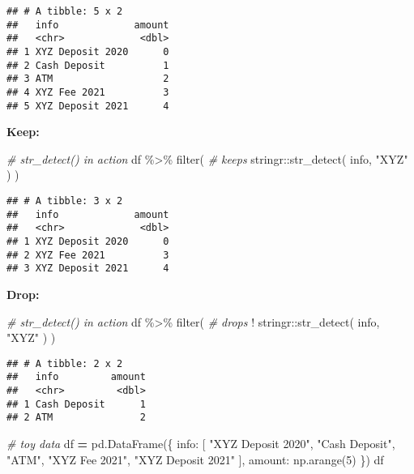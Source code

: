 \documentclass[
]{book}
\newenvironment{Shaded}{\begin{snugshade}}{\end{snugshade}}
\newcommand{\CommentTok}[1]{\textcolor[rgb]{0.56,0.35,0.01}{\textit{#1}}}
\newcommand{\DecValTok}[1]{\textcolor[rgb]{0.00,0.00,0.81}{#1}}
\newcommand{\FunctionTok}[1]{\textcolor[rgb]{0.00,0.00,0.00}{#1}}
\newcommand{\NormalTok}[1]{#1}
\newcommand{\OperatorTok}[1]{\textcolor[rgb]{0.81,0.36,0.00}{\textbf{#1}}}
\newcommand{\SpecialCharTok}[1]{\textcolor[rgb]{0.00,0.00,0.00}{#1}}
\newcommand{\StringTok}[1]{\textcolor[rgb]{0.31,0.60,0.02}{#1}}
\begin{document}
\begin{verbatim}
## # A tibble: 5 x 2
##   info             amount
##   <chr>             <dbl>
## 1 XYZ Deposit 2020      0
## 2 Cash Deposit          1
## 3 ATM                   2
## 4 XYZ Fee 2021          3
## 5 XYZ Deposit 2021      4
\end{verbatim}

\textbf{Keep:}

\begin{Shaded}
\begin{Highlighting}[]
\CommentTok{\# str\_detect() in action}
\NormalTok{df }\SpecialCharTok{\%\textgreater{}\%}
  \FunctionTok{filter}\NormalTok{( }\CommentTok{\# keeps}
\NormalTok{    stringr}\SpecialCharTok{::}\FunctionTok{str\_detect}\NormalTok{(}
\NormalTok{      info, }\StringTok{"XYZ"}
\NormalTok{    )}
\NormalTok{  )}
\end{Highlighting}
\end{Shaded}

\begin{verbatim}
## # A tibble: 3 x 2
##   info             amount
##   <chr>             <dbl>
## 1 XYZ Deposit 2020      0
## 2 XYZ Fee 2021          3
## 3 XYZ Deposit 2021      4
\end{verbatim}

\textbf{Drop:}

\begin{Shaded}
\begin{Highlighting}[]
\CommentTok{\# str\_detect() in action}
\NormalTok{df }\SpecialCharTok{\%\textgreater{}\%}
  \FunctionTok{filter}\NormalTok{( }\CommentTok{\# drops}
    \SpecialCharTok{!}\NormalTok{ stringr}\SpecialCharTok{::}\FunctionTok{str\_detect}\NormalTok{(}
\NormalTok{      info, }\StringTok{"XYZ"}
\NormalTok{    )}
\NormalTok{  )}
\end{Highlighting}
\end{Shaded}

\begin{verbatim}
## # A tibble: 2 x 2
##   info         amount
##   <chr>         <dbl>
## 1 Cash Deposit      1
## 2 ATM               2
\end{verbatim}

\begin{Shaded}
\begin{Highlighting}[]
\CommentTok{\# toy data}
\NormalTok{df }\OperatorTok{=}\NormalTok{ pd.DataFrame(\{}
    \StringTok{\textquotesingle{}info\textquotesingle{}}\NormalTok{:}
\NormalTok{    [}
    \StringTok{"XYZ Deposit 2020"}\NormalTok{,}
    \StringTok{"Cash Deposit"}\NormalTok{,}
    \StringTok{"ATM"}\NormalTok{,}
    \StringTok{"XYZ Fee 2021"}\NormalTok{,}
    \StringTok{"XYZ Deposit 2021"}
\NormalTok{],}
    \StringTok{\textquotesingle{}amount\textquotesingle{}}\NormalTok{: np.arange(}\DecValTok{5}\NormalTok{)    }
\NormalTok{\})}
\NormalTok{df}
\end{Highlighting}
\end{Shaded}
\end{document}
